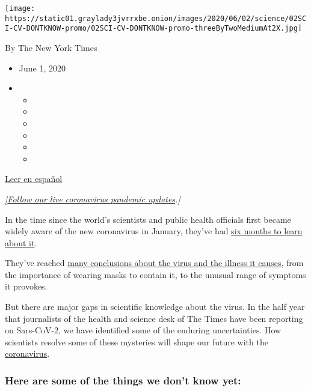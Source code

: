 \texttt{[image: https://static01.graylady3jvrrxbe.onion/images/2020/06/02/science/02SCI-CV-DONTKNOW-promo/02SCI-CV-DONTKNOW-promo-threeByTwoMediumAt2X.jpg]}

By The New York Times

\begin{itemize}
\item
  June 1, 2020
\item
  \begin{itemize}
  \item
  \item
  \item
  \item
  \item
  \item
  \end{itemize}
\end{itemize}

\href{https://www.nytimes3xbfgragh.onion/es/2020/06/03/espanol/misterios-coronavirus.html}{Leer
en español}

\emph{{[}}\href{https://www.nytimes3xbfgragh.onion/2020/06/02/world/live-coronavirus.html}{\emph{Follow
our live coronavirus pandemic updates}}\emph{.{]}}

In the time since the world's scientists and public health officials
first became widely aware of the new coronavirus in January, they've had
\href{https://www.nytimes3xbfgragh.onion/2020/06/02/health/coronavirus-profile-covid.html}{six
months to learn about it}.

They've reached
\href{https://www.nytimes3xbfgragh.onion/article/coronavirus-facts-history.html}{many
conclusions about the virus and the illness it causes}, from the
importance of wearing masks to contain it, to the unusual range of
symptoms it provokes.

But there are major gaps in scientific knowledge about the virus. In the
half year that journalists of the health and science desk of The Times
have been reporting on Sars-CoV-2, we have identified some of the
enduring uncertainties. How scientists resolve some of these mysteries
will shape our future with the
\href{https://www.nytimes3xbfgragh.onion/2020/06/11/health/coronavirus-lung-transplant.html}{coronavirus}.

\hypertarget{here-are-some-of-the-things-we-dont-know-yet}{%
\subsubsection{Here are some of the things we don't know
yet:}\label{here-are-some-of-the-things-we-dont-know-yet}}

